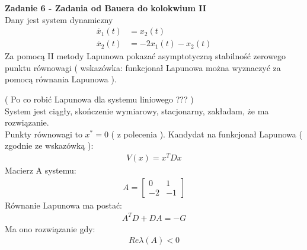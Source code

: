 \documentclass[a4paper,11pt]{article}
\begin{document}
\newpage
\begin{framed}
\textbf{Zadanie 6 - Zadania od Bauera do kolokwium II } \\ 
Dany jest system dynamiczny 
\begin{align*}
\dot{x_{1}}(t)&=x_{2}(t) \\
\dot{x_{2}}(t)&=-2x_{1}(t)-x_{2}(t)
\end{align*}
Za pomocą II metody Lapunowa pokazać asymptotyczną stabilność zerowego punktu równowagi ( wskazówka: funkcjonał Lapunowa można wyznaczyć za pomocą równania Lapunowa ). 
\end{framed}
( Po co robić Lapunowa dla systemu liniowego ??? ) \\ 
System jest ciągły, skończenie wymiarowy, stacjonarny, zakładam, że ma rozwiązanie.\\
Punkty równowagi to \( x^{*} = 0 \) ( z polecenia ). 
Kandydat na funkcjonał Lapunowa ( zgodnie ze wskazówką ): \\
\begin{align*}
V(x)=x^{T}Dx
\end{align*}
Macierz A systemu: \\
\begin{align*}
A = 
\begin{bmatrix}
0 & 1 \\
-2 & -1
\end{bmatrix}
\end{align*}
Równanie Lapunowa ma postać: \\
\begin{align*}
A^{T}D+DA = -G
\end{align*}
Ma ono rozwiązanie gdy: \\
\begin{align*}
Re \lambda(A) < 0 
\end{align*}
\end{document}
